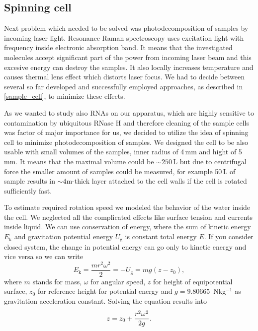 \subsection{Spinning cell}

Next problem which needed to be solved was photodecomposition of samples by
incoming laser light. Resonance Raman spectroscopy uses excitation light
with frequency inside electronic absorption band. It means that the
investigated molecules accept significant part of the power from incoming
laser beam and this excesive energy can destroy the samples. It also locally
increases temperature and causes thermal lens effect which distorts laser
focus. We had to decide between several so far developed and successfully
employed approaches, as described in \cref{sample_cell}, to minimize
these effects.

As we wanted to study also RNAs on our apparatus, which are highly sensitive
to contamination by ubiquitous RNase H and therefore cleaning of the sample
cells was factor of major importance for us, we decided to utilize the idea
of spinning cell to minimize photodecomposition of samples. We designed the
cell to be also usable with small volumes of the samples, inner radius of 4\,mm
and hight of 5\,mm. It means that the maximal volume could be $\sim250$\,L
but due to centrifugal force the smaller amount of samples could be measured,
for example 50\,L of sample results in $\sim 4$m-thick layer attached
to the cell walls if the cell is rotated sufficiently fast.

To estimate required rotation speed we modeled the behavior of the water
inside the cell. We neglected all the complicated effects like surface tension
and currents inside liquid. We can use conservation of energy, where the sum
of kinetic energy $E_\text{k}$ and gravitation potential energy $U_\text{g}$ is
constant total energy $E$. If you consider closed system, the change in
potential energy can go only to kinetic energy and vice versa so we can write
\begin{equation*}
	E_\text{k} = \frac{mr^2\omega^2}{2} = -U_\text{g} = mg(z - z_0),
\end{equation*}
where $m$ stands for mass, $\omega$ for angular speed, $z$ for height of
equipotential surface, $z_0$ for reference height for potential energy and
$g = 9.80665$\, Nkg$^{-1}$ as gravitation acceleration constant. Solving the
equation results into
\begin{equation}
	z = z_0 + \frac{r^2\omega^2}{2g}.
	\label{\eqnlabel{spinning_cell:liquid_surface}}
\end{equation}

